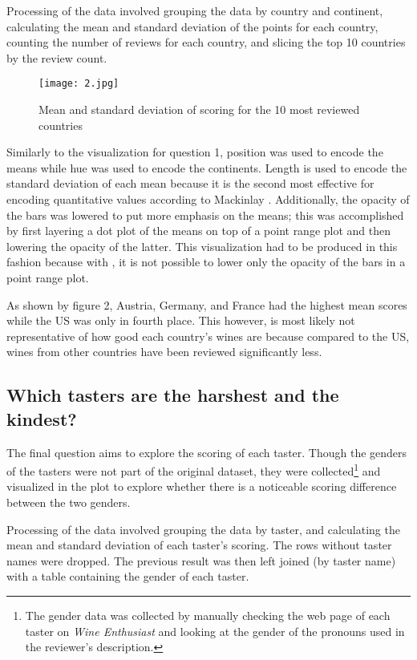 Processing of the data involved grouping the data by country and continent, calculating the mean and standard deviation of the points for each country, counting the number of reviews for each country, and slicing the top 10 countries by the review count.

\begin{figure}[h]
  \texttt{[image: 2.jpg]} 
  \caption{Mean and standard deviation of scoring for the 10 most reviewed countries}
\end{figure}

Similarly to the visualization for question 1, position was used to encode the means while hue was used to encode the continents. Length is used to encode the standard deviation of each mean because it is the second most effective for encoding quantitative values according to Mackinlay \cite{Mackinlay}. Additionally, the opacity of the bars was lowered to put more emphasis on the means; this was accomplished by first layering a dot plot of the means on top of a point range plot and then lowering the opacity of the latter. This visualization had to be produced in this fashion because with , it is not possible to lower only the opacity of the bars in a point range plot.

As shown by figure 2, Austria, Germany, and France had the highest mean scores while the US was only in fourth place. This however, is most likely not representative of how good each country's wines are because compared to the US, wines from other countries have been reviewed significantly less.

\subsection{Which tasters are the harshest and the kindest?}
The final question aims to explore the scoring of each taster. Though the genders of the tasters were not part of the original dataset, they were collected\footnote{The gender data was collected by manually checking the web page of each taster on \emph{Wine Enthusiast} and looking at the gender of the pronouns used in the reviewer's description.} and visualized in the plot to explore whether there is a noticeable scoring difference between the two genders.

Processing of the data involved grouping the data by taster, and calculating the mean and standard deviation of each taster's scoring. The rows without taster names were dropped. The previous result was then left joined (by taster name) with a table containing the gender of each taster.

